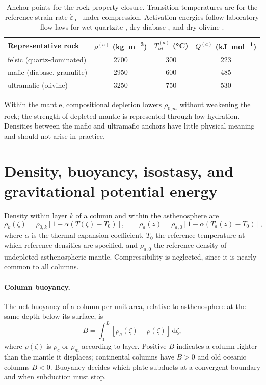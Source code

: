\documentclass[11pt]{article}
\newcommand{\dd}{\,\mathrm{d}}
\begin{document}
\begin{table}[h]
\centering
\caption{Anchor points for the rock-property closure. Transition temperatures
are for the reference strain rate $\dot\varepsilon_{\mathrm{ref}}$ under
compression. Activation energies follow laboratory flow laws for wet quartzite
\cite{GleasonTullis1995}, dry diabase \cite{Mackwell1998}, and dry olivine
\cite{HirthKohlstedt2003}.}
\label{tab:anchors}
\begin{tabular}{@{}lccc@{}}
\toprule
Representative rock & $\rho^{(a)}$ (\si{\kilo\gram\per\cubic\metre}) & $T_{bd}^{(a)}$ (\si{\celsius}) & $Q^{(a)}$ (\si{\kilo\joule\per\mole}) \\
\midrule
felsic (quartz-dominated) & 2700 & 300 & 223 \\
mafic (diabase, granulite) & 2950 & 600 & 485 \\
ultramafic (olivine) & 3250 & 750 & 530 \\
\bottomrule
\end{tabular}
\end{table}

Within the mantle, compositional depletion lowers $\rho_{0,m}$ without weakening
the rock; the strength of depleted mantle is represented through low hydration.
Densities between the mafic and ultramafic anchors have little physical meaning
and should not arise in practice.

\section{Density, buoyancy, isostasy, and gravitational potential energy}
\label{sec:density}

Density within layer $k$ of a column and within the asthenosphere are
\begin{equation}
  \rho_k(\zeta) = \rho_{0,k}\left[1 - \alpha\left(T(\zeta) - T_0\right)\right],
  \qquad
  \rho_a(z) = \rho_{a,0}\left[1 - \alpha\left(T_a(z) - T_0\right)\right],
\end{equation}
where $\alpha$ is the thermal expansion coefficient, $T_0$ the reference
temperature at which reference densities are specified, and $\rho_{a,0}$ the
reference density of undepleted asthenospheric mantle. Compressibility is
neglected, since it is nearly common to all columns.

\paragraph{Column buoyancy.}
The net buoyancy of a column per unit area, relative to asthenosphere at the
same depth below its surface, is
\begin{equation}
  B = \int_0^{L} \left[\rho_a(\zeta) - \rho(\zeta)\right] \dd\zeta,
  \label{eq:buoyancy}
\end{equation}
where $\rho(\zeta)$ is $\rho_c$ or $\rho_m$ according to layer. Positive $B$
indicates a column lighter than the mantle it displaces; continental columns
have $B > 0$ and old oceanic columns $B < 0$. Buoyancy decides which plate
subducts at a convergent boundary and when subduction must stop.
\end{document}
